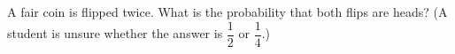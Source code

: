 A fair coin is flipped twice. What is the probability that both flips are heads? (A student is unsure whether the answer is $\dfrac12$ or $\dfrac14$.)
